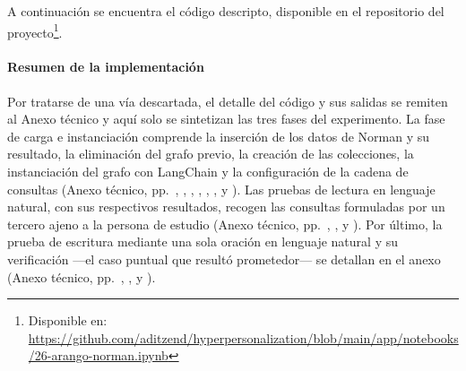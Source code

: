 A continuación se encuentra el código descripto, disponible en el repositorio del proyecto\footnote{Disponible en: \url{https://github.com/aditzend/hyperpersonalization/blob/main/app/notebooks/26-arango-norman.ipynb}}.

\paragraph{Resumen de la implementación}

Por tratarse de una vía descartada, el detalle del código y sus salidas se remiten al Anexo técnico y aquí solo se sintetizan las tres fases del experimento. La fase de carga e instanciación comprende la inserción de los datos de Norman y su resultado, la eliminación del grafo previo, la creación de las colecciones, la instanciación del grafo con LangChain y la configuración de la cadena de consultas (Anexo técnico, pp.~\pageref{anexo:code-4-4-1-1}, \pageref{anexo:code-4-4-1-2}, \pageref{anexo:code-4-4-1-3}, \pageref{anexo:code-4-4-1-4}, \pageref{anexo:code-4-4-1-5}, \pageref{anexo:code-4-4-1-6}, \pageref{anexo:code-4-4-1-7} y \pageref{anexo:code-4-4-1-8}). Las pruebas de lectura en lenguaje natural, con sus respectivos resultados, recogen las consultas formuladas por un tercero ajeno a la persona de estudio (Anexo técnico, pp.~\pageref{anexo:code-4-4-1-9}, \pageref{anexo:code-4-4-1-10}, \pageref{anexo:code-4-4-1-11} y \pageref{anexo:code-4-4-1-12}). Por último, la prueba de escritura mediante una sola oración en lenguaje natural y su verificación —el caso puntual que resultó prometedor— se detallan en el anexo (Anexo técnico, pp.~\pageref{anexo:code-4-4-1-13}, \pageref{anexo:code-4-4-1-14}, \pageref{anexo:code-4-4-1-15} y \pageref{anexo:code-4-4-1-16}).

